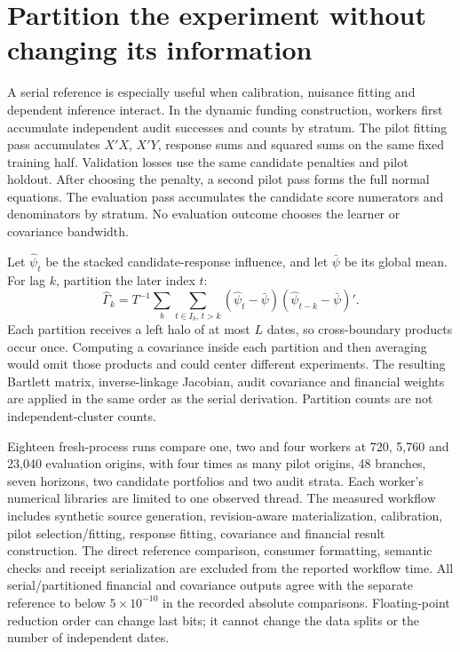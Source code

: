 \section{Partition the experiment without changing its information}
\label{s6:partitioned}
A serial reference is especially useful when calibration, nuisance fitting
and dependent inference interact. In the dynamic funding construction,
workers first accumulate independent audit successes and counts by stratum.
The pilot fitting pass accumulates $X'X$, $X'Y$, response sums and squared
sums on the same fixed training half. Validation losses use the same
candidate penalties and pilot holdout. After choosing the penalty, a second
pilot pass forms the full normal equations. The evaluation pass accumulates
the candidate score numerators and denominators by stratum. No evaluation
outcome chooses the learner or covariance bandwidth.

Let $\hat\psi_t$ be the stacked candidate-response influence, and let
$\bar\psi$ be its global mean. For lag $k$, partition the later index $t$:
\[
 \hat\Gamma_k=T^{-1}\sum_b\sum_{t\in I_b,\,t>k}
   (\hat\psi_t-\bar\psi)(\hat\psi_{t-k}-\bar\psi)'.
\]
Each partition receives a left halo of at most $L$ dates, so cross-boundary
products occur once. Computing a covariance inside each partition and then
averaging would omit those products and could center different experiments.
The resulting Bartlett matrix, inverse-linkage Jacobian, audit covariance
and financial weights are applied in the same order as the serial derivation.
Partition counts are not independent-cluster counts.

Eighteen fresh-process runs compare one, two and four workers at 720,
5,760 and 23,040 evaluation origins, with four times as many pilot origins,
48 branches, seven horizons, two candidate portfolios and two audit strata.
Each worker's numerical libraries are limited to one observed thread.
The measured workflow includes synthetic source generation, revision-aware
materialization, calibration, pilot selection/fitting, response fitting,
covariance and financial result construction. The direct reference comparison,
consumer formatting, semantic checks and receipt serialization are excluded
from the reported workflow time.
All serial/partitioned financial and covariance outputs agree with the
separate reference to below $5\times10^{-10}$ in the recorded absolute
comparisons. Floating-point reduction order can change last bits; it cannot
change the data splits or the number of independent dates.

